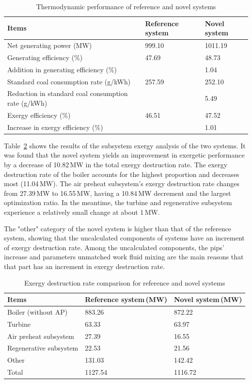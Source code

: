 \documentclass[preprint,12pt]{elsarticle}
\begin{document}
\begin{table}
\caption{Thermodynamic performance of reference and novel systems}
\label{table:thermal performance compare}
\centering
\begin{tabular}{p{7.5cm}p{1.75cm}p{1.75cm}}
\toprule 
Items & Reference system & Novel system\tabularnewline
\midrule
Net generating power (MW) & 999.10 & 1011.19\tabularnewline
Generating efficiency (\%) & 47.69 & 48.73\tabularnewline
Addition in generating efficiency (\%) &  & 1.04\tabularnewline %
Standard coal consumption rate (g/kWh) & 257.59 & 252.10\tabularnewline
Reduction in standard coal consumption rate (g/kWh) &  & 5.49\tabularnewline
Exergy efficiency (\%) & 46.51 & 47.52\tabularnewline
Increase in exergy efficiency (\%) &  & 1.01\tabularnewline
\bottomrule
\end{tabular}
\end{table}
Table~\ref{table:system exergy campare} shows the results of the subsystem exergy analysis of the two systems. 
It was found that the novel system yields an improvement in exergetic performance by a decrease of 10.82\,MW in the total exergy destruction rate.
The exergy destruction rate of the boiler accounts for the highest proportion and decreases most (11.04\,MW). %
The air preheat subsystem's exergy destruction rate changes from 27.39\,MW to 16.55\,MW, having a 10.84\,MW decrement and the largest optimization ratio. %
In the meantime, the turbine and regenerative subsystem experience a relatively small change at about 1\,MW.  %

The "other" category of the novel system is higher
than that of the reference system, showing that the uncalculated components of systems have an increment of exergy destruction rate. %
Among the uncalculated components, the pips' increase and parameters unmatched work fluid mixing
are the main reasons that that part has an increment in exergy destruction rate.

\begin{table}
\caption{Exergy destruction rate comparison for reference and novel systems }
\label{table:system exergy campare}
\centering
\begin{tabular}{lll}
\toprule 
Items & Reference system\,(MW) & Novel system\,(MW)\tabularnewline
\midrule 
Boiler (without AP) & 883.26 & 872.22\tabularnewline
Turbine & 63.33 & 63.97\tabularnewline
Air preheat subsystem  & 27.39 & 16.55\tabularnewline
Regenerative subsystem & 22.53 & 21.56\tabularnewline
Other & 131.03 & 142.42 \tabularnewline
Total & 1127.54 & 1116.72\tabularnewline
\bottomrule
\end{tabular}
\end{table}
\end{document}
